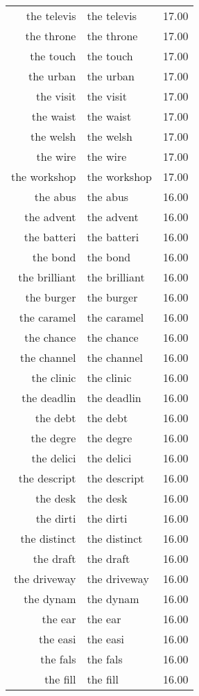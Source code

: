 \begin{table}[ht]
\begin{tabular}{rlr}
  the televis & the televis & 17.00 \\ 
  the throne & the throne & 17.00 \\ 
  the touch & the touch & 17.00 \\ 
  the urban & the urban & 17.00 \\ 
  the visit & the visit & 17.00 \\ 
  the waist & the waist & 17.00 \\ 
  the welsh & the welsh & 17.00 \\ 
  the wire & the wire & 17.00 \\ 
  the workshop & the workshop & 17.00 \\ 
  the abus & the abus & 16.00 \\ 
  the advent & the advent & 16.00 \\ 
  the batteri & the batteri & 16.00 \\ 
  the bond & the bond & 16.00 \\ 
  the brilliant & the brilliant & 16.00 \\ 
  the burger & the burger & 16.00 \\ 
  the caramel & the caramel & 16.00 \\ 
  the chance & the chance & 16.00 \\ 
  the channel & the channel & 16.00 \\ 
  the clinic & the clinic & 16.00 \\ 
  the deadlin & the deadlin & 16.00 \\ 
  the debt & the debt & 16.00 \\ 
  the degre & the degre & 16.00 \\ 
  the delici & the delici & 16.00 \\ 
  the descript & the descript & 16.00 \\ 
  the desk & the desk & 16.00 \\ 
  the dirti & the dirti & 16.00 \\ 
  the distinct & the distinct & 16.00 \\ 
  the draft & the draft & 16.00 \\ 
  the driveway & the driveway & 16.00 \\ 
  the dynam & the dynam & 16.00 \\ 
  the ear & the ear & 16.00 \\ 
  the easi & the easi & 16.00 \\ 
  the fals & the fals & 16.00 \\ 
  the fill & the fill & 16.00 \\ 

\end{tabular}
\end{table}
